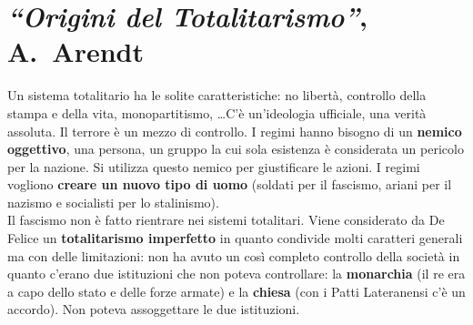 
\section{\textit{``Origini del Totalitarismo''}, A.~Arendt}
Un sistema totalitario ha le solite caratteristiche: no libertà, controllo della stampa e della vita,
monopartitismo, \ldots C'è un'ideologia ufficiale, una verità assoluta. Il terrore è un mezzo di 
controllo. I regimi hanno bisogno di un \textbf{nemico oggettivo}, una persona, un gruppo la cui
sola esistenza è considerata un pericolo per la nazione. Si utilizza questo nemico per giustificare
le azioni. I regimi vogliono \textbf{creare un nuovo tipo di uomo} (soldati per il fascismo,
ariani per il nazismo e socialisti per lo stalinismo).\\
Il fascismo non è fatto rientrare nei sistemi totalitari. Viene considerato da De Felice un
\textbf{totalitarismo imperfetto} in quanto condivide molti caratteri generali ma con delle 
limitazioni: non ha avuto un così completo controllo della società in quanto c'erano due istituzioni
che non poteva controllare: la \textbf{monarchia} (il re era a capo dello stato e delle forze armate)
e la \textbf{chiesa} (con i Patti Lateranensi c'è un accordo). Non poteva assoggettare le due 
istituzioni.
